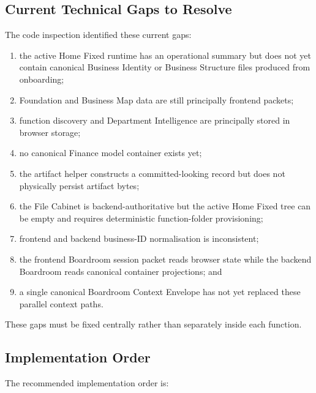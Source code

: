 \subsection{Current Technical Gaps to Resolve}

The code inspection identified these current gaps:

\begin{enumerate}
  \item the active Home Fixed runtime has an operational summary but does not yet
  contain canonical Business Identity or Business Structure files produced from
  onboarding;
  \item Foundation and Business Map data are still principally frontend packets;
  \item function discovery and Department Intelligence are principally stored in
  browser storage;
  \item no canonical Finance model container exists yet;
  \item the artifact helper constructs a committed-looking record but does not
  physically persist artifact bytes;
  \item the File Cabinet is backend-authoritative but the active Home Fixed tree
  can be empty and requires deterministic function-folder provisioning;
  \item frontend and backend business-ID normalisation is inconsistent;
  \item the frontend Boardroom session packet reads browser state while the
  backend Boardroom reads canonical container projections; and
  \item a single canonical Boardroom Context Envelope has not yet replaced these
  parallel context paths.
\end{enumerate}

These gaps must be fixed centrally rather than separately inside each function.

\subsection{Implementation Order}

The recommended implementation order is:

